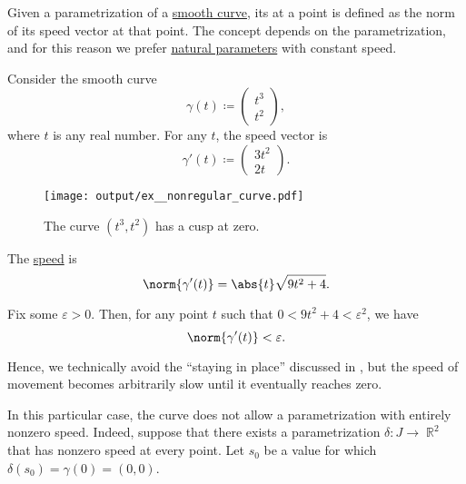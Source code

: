\begin{definition}\label{def:curve_speed}
  Given a parametrization of a \hyperref[def:smooth_curve]{smooth curve}, its  at a point is defined as the norm of its speed vector at that point. The concept depends on the parametrization, and for this reason we prefer \hyperref[thm:natural_parametrization_existence]{natural parameters} with constant speed.
\end{definition}

\begin{example}\label{ex:nonregular_curve}
  Consider the smooth curve
  \begin{equation*}
    \gamma(t)
    \coloneqq
    \begin{pmatrix}
      t^3 \\ t^2
    \end{pmatrix},
  \end{equation*}
  where \( t \) is any real number. For any \( t \), the speed vector is
  \begin{equation*}
    \gamma'(t)
    \coloneqq
    \begin{pmatrix}
      3t^2 \\ 2t
    \end{pmatrix}.
  \end{equation*}

  \begin{figure}[!ht]
    \centering
    \texttt{[image: output/ex\_\_nonregular\_curve.pdf]}
    \caption{The curve \( (t^3, t^2) \) has a cusp at zero.}\label{fig:ex:nonregular_curve}
  \end{figure}

  The \hyperref[def:curve_speed]{speed} is
  \begin{equation*}
    \norm{\gamma'(t)} = \abs{t} \sqrt{9 t^2 + 4}.
  \end{equation*}

  Fix some \( \varepsilon > 0 \). Then, for any point \( t \) such that \( 0 < 9 t^2 + 4 < \varepsilon^2 \), we have
  \begin{equation*}
    \norm{\gamma'(t)} < \varepsilon.
  \end{equation*}

  Hence, we technically avoid the \enquote{staying in place} discussed in , but the speed of movement becomes arbitrarily slow until it eventually reaches zero.

  In this particular case, the curve does not allow a parametrization with entirely nonzero speed. Indeed, suppose that there exists a parametrization \( \delta: J \to \BbbR^2 \) that has nonzero speed at every point. Let \( s_0 \) be a value for which \( \delta(s_0) = \gamma(0) = (0, 0) \).


\end{example}
